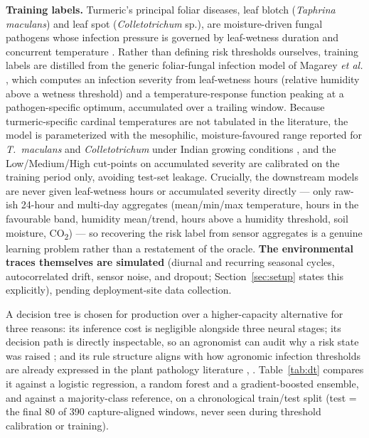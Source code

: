 \documentclass[journal]{IEEEtran}
\begin{document}
\textbf{Training labels.} Turmeric's principal foliar diseases, leaf blotch
(\textit{Taphrina maculans}) and leaf spot (\textit{Colletotrichum} sp.), are
moisture-driven fungal pathogens whose infection pressure is governed by leaf-wetness
duration and concurrent temperature \cite{ref35}. Rather than defining risk
thresholds ourselves, training labels are distilled from the generic foliar-fungal
infection model of Magarey \emph{et al.} \cite{ref34}, which computes an infection
severity from leaf-wetness hours (relative humidity above a wetness threshold) and a
temperature-response function peaking at a pathogen-specific optimum, accumulated
over a trailing window. Because turmeric-specific cardinal temperatures are not
tabulated in the literature, the model is parameterized with the mesophilic,
moisture-favoured range reported for \textit{T.\ maculans} and \textit{Colletotrichum}
under Indian growing conditions \cite{ref35}, and the Low/Medium/High cut-points on
accumulated severity are calibrated on the training period only, avoiding test-set
leakage. Crucially, the downstream models are never given leaf-wetness hours or
accumulated severity directly --- only raw-ish 24-hour and multi-day aggregates
(mean/min/max temperature, hours in the favourable band, humidity mean/trend, hours
above a humidity threshold, soil moisture, CO\textsubscript{2}) --- so recovering the
risk label from sensor aggregates is a genuine learning problem rather than a
restatement of the oracle. \textbf{The environmental traces themselves are
simulated} (diurnal and recurring seasonal cycles, autocorrelated drift, sensor
noise, and dropout; Section~\ref{sec:setup} states this explicitly), pending
deployment-site data collection.

A decision tree is chosen for production over a higher-capacity alternative for
three reasons: its inference cost is negligible alongside three neural stages; its
decision path is directly inspectable, so an agronomist can audit why a risk state
was raised \cite{ref28}; and its rule structure aligns with how agronomic infection
thresholds are already expressed in the plant pathology literature \cite{ref25},
\cite{ref26}. Table~\ref{tab:dt} compares it against a logistic regression, a
random forest and a gradient-boosted ensemble, and against a majority-class
reference, on a chronological train/test split (test = the final 80 of 390
capture-aligned windows, never seen during threshold calibration or training).
\end{document}
